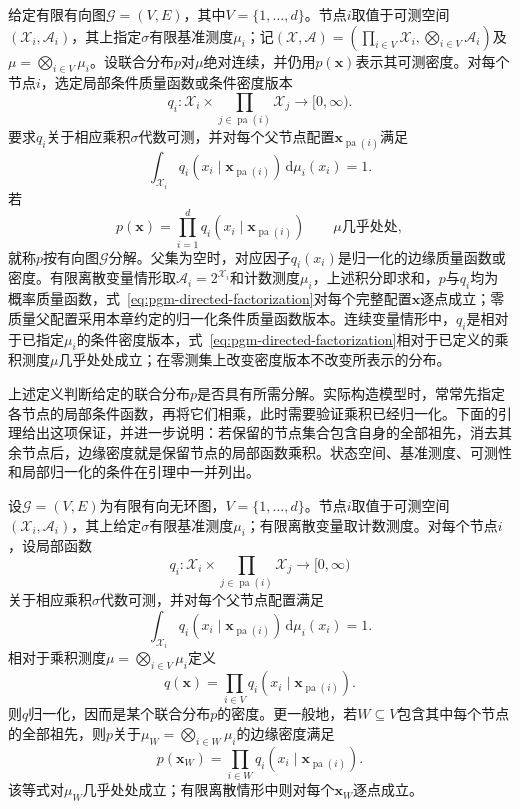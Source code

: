 \begin{definition}[按有向图分解]
  \label{def:pgm-directed-factorization}
  给定有限有向图$\mathcal{G}=(V,E)$，其中$V=\{1,\ldots,d\}$。节点$i$取值于可测空间$(\mathcal{X}_i,\mathcal{A}_i)$，其上指定$\sigma$有限基准测度$\mu_i$；记$(\mathcal{X},\mathcal{A})=(\prod_{i\in V}\mathcal{X}_i,\bigotimes_{i\in V}\mathcal{A}_i)$及$\mu=\bigotimes_{i\in V}\mu_i$。设联合分布$p$对$\mu$绝对连续，并仍用$p(\bm{x})$表示其可测密度。对每个节点$i$，选定局部条件质量函数或条件密度版本
  \[
    q_i:
    \mathcal{X}_i\times
    \prod_{j\in\operatorname{pa}(i)}\mathcal{X}_j
    \longrightarrow[0,\infty).
  \]
  要求$q_i$关于相应乘积$\sigma$代数可测，并对每个父节点配置$\bm{x}_{\operatorname{pa}(i)}$满足
  \[
    \int_{\mathcal{X}_i}
    q_i(x_i\mid\bm{x}_{\operatorname{pa}(i)})\,\mathrm{d}\mu_i(x_i)=1.
  \]
  若
  \begin{equation}
    p(\bm{x})=\prod_{i=1}^{d}
      q_i(x_i\mid\bm{x}_{\operatorname{pa}(i)})
      \qquad\text{$\mu$几乎处处},
    \label{eq:pgm-directed-factorization}
  \end{equation}
  就称$p$按有向图$\mathcal{G}$分解。父集为空时，对应因子$q_i(x_i)$是归一化的边缘质量函数或密度。有限离散变量情形取$\mathcal{A}_i=2^{\mathcal{X}_i}$和计数测度$\mu_i$，上述积分即求和，$p$与$q_i$均为概率质量函数，式~\eqref{eq:pgm-directed-factorization}对每个完整配置$\bm{x}$逐点成立；零质量父配置采用本章约定的归一化条件质量函数版本。连续变量情形中，$q_i$是相对于已指定$\mu_i$的条件密度版本，式~\eqref{eq:pgm-directed-factorization}相对于已定义的乘积测度$\mu$几乎处处成立；在零测集上改变密度版本不改变所表示的分布。
\end{definition}

上述定义判断给定的联合分布$p$是否具有所需分解。实际构造模型时，常常先指定各节点的局部条件函数，再将它们相乘，此时需要验证乘积已经归一化。下面的引理给出这项保证，并进一步说明：若保留的节点集合包含自身的全部祖先，消去其余节点后，边缘密度就是保留节点的局部函数乘积。状态空间、基准测度、可测性和局部归一化的条件在引理中一并列出。

\begin{lemma}[局部归一化与祖先边缘化]
  \label{lem:pgm-directed-normalization}
  设$\mathcal{G}=(V,E)$为有限有向无环图，$V=\{1,\ldots,d\}$。节点$i$取值于可测空间$(\mathcal{X}_i,\mathcal{A}_i)$，其上给定$\sigma$有限基准测度$\mu_i$；有限离散变量取计数测度。对每个节点$i$，设局部函数
  \[
    q_i:
    \mathcal{X}_i\times
    \prod_{j\in\operatorname{pa}(i)}\mathcal{X}_j
    \longrightarrow[0,\infty)
  \]
  关于相应乘积$\sigma$代数可测，并对每个父节点配置满足
  \[
    \int_{\mathcal{X}_i}
    q_i(x_i\mid\bm{x}_{\operatorname{pa}(i)})\,\mathrm{d}\mu_i(x_i)=1.
  \]
  相对于乘积测度$\mu=\bigotimes_{i\in V}\mu_i$定义
  \[
    q(\bm{x})=\prod_{i\in V}
    q_i(x_i\mid\bm{x}_{\operatorname{pa}(i)}).
  \]
  则$q$归一化，因而是某个联合分布$p$的密度。更一般地，若$W\subseteq V$包含其中每个节点的全部祖先，则$p$关于$\mu_W=\bigotimes_{i\in W}\mu_i$的边缘密度满足
  \begin{equation}
    p(\bm{x}_W)=
    \prod_{i\in W}q_i(x_i\mid\bm{x}_{\operatorname{pa}(i)}).
    \label{eq:pgm-directed-ancestral-marginal}
  \end{equation}
  该等式对$\mu_W$几乎处处成立；有限离散情形中则对每个$\bm{x}_W$逐点成立。
\end{lemma}

